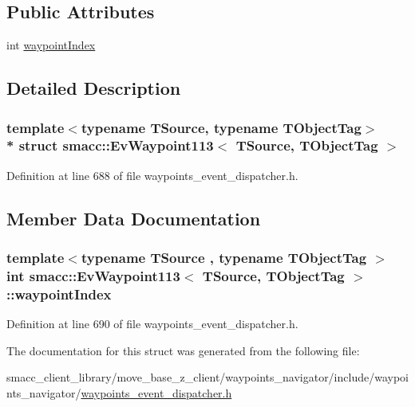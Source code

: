 \subsection*{Public Attributes}
\begin{DoxyCompactItemize}
\item 
int \hyperlink{structsmacc_1_1EvWaypoint113_a9d83f44d3dfcad3fee99e6ce96557754}{waypoint\+Index}
\end{DoxyCompactItemize}


\subsection{Detailed Description}
\subsubsection*{template$<$typename T\+Source, typename T\+Object\+Tag$>$\\*
struct smacc\+::\+Ev\+Waypoint113$<$ T\+Source, T\+Object\+Tag $>$}



Definition at line 688 of file waypoints\+\_\+event\+\_\+dispatcher.\+h.



\subsection{Member Data Documentation}
\subsubsection[{\texorpdfstring{waypoint\+Index}{waypointIndex}}]{\setlength{\rightskip}{0pt plus 5cm}template$<$typename T\+Source , typename T\+Object\+Tag $>$ int {\bf smacc\+::\+Ev\+Waypoint113}$<$ T\+Source, T\+Object\+Tag $>$\+::waypoint\+Index}\hypertarget{structsmacc_1_1EvWaypoint113_a9d83f44d3dfcad3fee99e6ce96557754}{}\label{structsmacc_1_1EvWaypoint113_a9d83f44d3dfcad3fee99e6ce96557754}


Definition at line 690 of file waypoints\+\_\+event\+\_\+dispatcher.\+h.



The documentation for this struct was generated from the following file\+:\begin{DoxyCompactItemize}
\item 
smacc\+\_\+client\+\_\+library/move\+\_\+base\+\_\+z\+\_\+client/waypoints\+\_\+navigator/include/waypoints\+\_\+navigator/\hyperlink{waypoints__event__dispatcher_8h}{waypoints\+\_\+event\+\_\+dispatcher.\+h}\end{DoxyCompactItemize}
